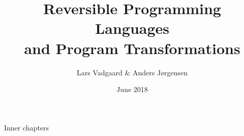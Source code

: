 \documentclass[12pt,twoside,openright,pdftex]{report}
\begin{document}
\title{%
  Reversible Programming Languages\\
  and Program Transformations
}%
\author{Lars Vadgaard \& Anders Jørgensen}
\date{June 2018}%


\maketitle
\clearpage\maketitle
\thispagestyle{empty}
\newpage
\setcounter{page}{1}



\tableofcontents

 Inner chapters






\newpage
\printbibliography[heading=bibintoc,title={References}]


\end{document}

